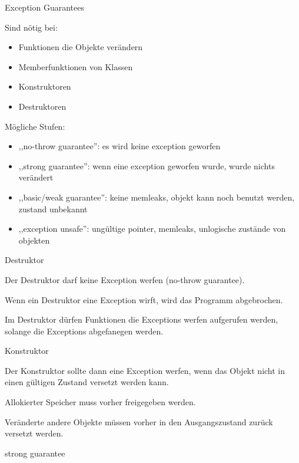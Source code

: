 \begin{frame}{Exception Guarantees}

    Sind nötig bei: 
	\begin{itemize}
		\item Funktionen die Objekte verändern
		\item Memberfunktionen von Klassen
		\item Konstruktoren
		\item Destruktoren
	\end{itemize}
	
	Mögliche Stufen:
	\begin{itemize}
			\item ,,no-throw guarantee'': es wird keine exception geworfen
			\item ,,strong guarantee'': wenn eine exception geworfen wurde, wurde nichts verändert
			\item ,,basic/weak guarantee'': keine memleaks, objekt kann noch benutzt werden, zustand unbekannt
			\item ,,exception unsafe'': ungültige pointer, memleaks, unlogische zustände von objekten
	\end{itemize}

\end{frame}


\begin{frame}{Destruktor}

    Der Destruktor darf keine Exception werfen (no-throw guarantee).
    
    Wenn ein Destruktor eine Exception wirft, wird das Programm abgebrochen.
    
    Im Destruktor dürfen Funktionen die Exceptions werfen aufgerufen werden, solange die Exceptions abgefanegen werden.

\end{frame}

\begin{frame}{Konstruktor}

    Der Konstruktor sollte dann eine Exception werfen, wenn das Objekt nicht in einen gültigen Zustand versetzt werden kann.
    
    Allokierter Speicher muss vorher freigegeben werden.
    
    Veränderte andere Objekte müssen vorher in den Ausgangszustand zurück versetzt werden.
    
    strong guarantee
    

\end{frame}

